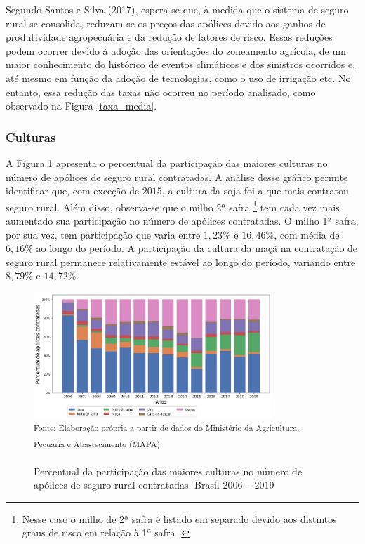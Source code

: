 Segundo Santos e Silva (2017), espera-se que, à medida que o sistema de seguro rural se consolida, reduzam-se os preços das apólices devido aos ganhos de produtividade agropecuária e da redução de fatores de risco. Essas reduções podem ocorrer devido à adoção das orientações do zoneamento agrícola, de um maior conhecimento do histórico de eventos climáticos e dos sinistros ocorridos e, até mesmo em função da adoção de tecnologias, como o uso de irrigação etc. No entanto, essa redução das taxas não ocorreu no período analisado, como observado na Figura \ref{taxa_media}. 

\subsubsection{Culturas}

A Figura \ref{percent_cult_apol} apresenta o percentual da participação das maiores culturas no número de apólices de seguro rural contratadas. A análise desse gráfico permite identificar que, com exceção de $2015$, a cultura da soja foi a que mais contratou seguro rural. Além disso, observa-se que o milho 2ª safra \footnote{Nesse caso o milho de 2ª safra é listado em separado devido aos distintos graus de risco em relação à 1ª safra \cite{santos17}.} tem cada vez mais aumentado sua participação no número de apólices contratadas. O milho 1ª safra, por sua vez, tem participação que varia entre $1,23\%$ e $16,46\%$, com média de  $6,16\%$ ao longo do período. A participação da cultura da maçã na contratação de seguro rural permanece relativamente estável ao longo do período, variando entre $8,79\%$ e $14,72\%$. 

\begin{figure}[H]
	\centering
	\caption{Percentual da participação das maiores culturas no número de apólices de seguro rural contratadas. Brasil $2006 - 2019$}
    	\includegraphics[width=0.8\textwidth]{figuras/percent_apolic_cult.png}\\
	\small \textsuperscript {Fonte: Elaboração própria a partir de dados do Ministério da Agricultura, Pecuária e Abastecimento (MAPA)}
    \label{percent_cult_apol}
\end{figure}


